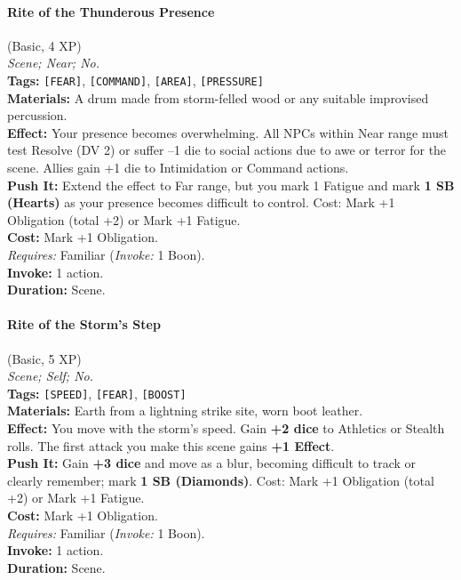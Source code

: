 \paragraph{Rite of the Thunderous Presence} (Basic, 4 XP) \hfill \\
\emph{Scene; Near; No.} \\
\textbf{Tags:} \texttt{[FEAR]}, \texttt{[COMMAND]}, \texttt{[AREA]}, \texttt{[PRESSURE]} \\
\textbf{Materials:} A drum made from storm-felled wood or any suitable improvised percussion. \\
\textbf{Effect:} Your presence becomes overwhelming. All NPCs within Near range must test Resolve (DV 2) or suffer --1 die to social actions due to awe or terror for the scene. Allies gain +1 die to Intimidation or Command actions. \\
\textbf{Push It:} Extend the effect to Far range, but you mark 1 Fatigue and mark \textbf{1 SB (Hearts)} as your presence becomes difficult to control. Cost: Mark +1 Obligation (total +2) or Mark +1 Fatigue. \\
\textbf{Cost:} Mark +1 Obligation. \\
\textit{Requires:} Familiar (\textit{Invoke:} 1 Boon). \\
\textbf{Invoke:} 1 action. \\
\textbf{Duration:} Scene.

\paragraph{Rite of the Storm's Step} (Basic, 5 XP) \hfill \\
\emph{Scene; Self; No.} \\
\textbf{Tags:} \texttt{[SPEED]}, \texttt{[FEAR]}, \texttt{[BOOST]} \\
\textbf{Materials:} Earth from a lightning strike site, worn boot leather. \\
\textbf{Effect:} You move with the storm's speed. Gain \textbf{+2 dice} to Athletics or Stealth rolls. The first attack you make this scene gains \textbf{+1 Effect}. \\
\textbf{Push It:} Gain \textbf{+3 dice} and move as a blur, becoming difficult to track or clearly remember; mark \textbf{1 SB (Diamonds)}. Cost: Mark +1 Obligation (total +2) or Mark +1 Fatigue. \\
\textbf{Cost:} Mark +1 Obligation. \\
\textit{Requires:} Familiar (\textit{Invoke:} 1 Boon). \\
\textbf{Invoke:} 1 action. \\
\textbf{Duration:} Scene.

